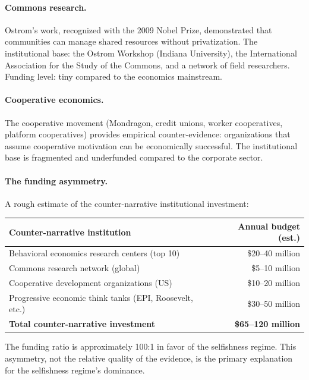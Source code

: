 \paragraph{Commons research.}
Ostrom's work, recognized with the 2009 Nobel Prize, demonstrated that communities can manage shared resources without privatization.
The institutional base: the Ostrom Workshop (Indiana University), the International Association for the Study of the Commons, and a network of field researchers.
Funding level: tiny compared to the economics mainstream.

\paragraph{Cooperative economics.}
The cooperative movement (Mondragon, credit unions, worker cooperatives, platform cooperatives) provides empirical counter-evidence: organizations that assume cooperative motivation can be economically successful.
The institutional base is fragmented and underfunded compared to the corporate sector.

\paragraph{The funding asymmetry.}
A rough estimate of the counter-narrative institutional investment:

\begin{center}
\begin{tabular}{lr}
\toprule
Counter-narrative institution & Annual budget (est.) \\
\midrule
Behavioral economics research centers (top 10) & \$20--40 million \\
Commons research network (global) & \$5--10 million \\
Cooperative development organizations (US) & \$10--20 million \\
Progressive economic think tanks (EPI, Roosevelt, etc.) & \$30--50 million \\
\midrule
\textbf{Total counter-narrative investment} & \textbf{\$65--120 million} \\
\bottomrule
\end{tabular}
\end{center}

The funding ratio is approximately 100:1 in favor of the selfishness regime.
This asymmetry, not the relative quality of the evidence, is the primary explanation for the selfishness regime's dominance.

